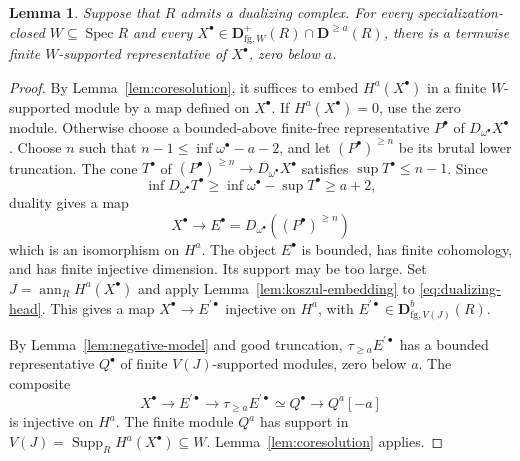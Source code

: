 \documentclass[11pt]{amsart}
\numberwithin{equation}{section}
\newtheorem{lemma}[theorem]{Lemma}
\theoremstyle{definition}
\theoremstyle{remark}
\DeclareMathOperator{\Supp}{Supp}
\DeclareMathOperator{\Spec}{Spec}
\newcommand{\D}{\mathbf D}
\newcommand{\fg}{\mathrm{fg}}
\begin{document}
\begin{lemma}
\label{lem:dualizing-supported-model}
Suppose that $R$ admits a dualizing complex. For every specialization-closed
$W\subseteq\Spec R$ and every
$X^{\bullet}\in\D^+_{\fg,W}(R)\cap\D^{\geq a}(R)$, there is a termwise finite
$W$-supported representative of $X^{\bullet}$, zero below $a$.
\end{lemma}
\begin{proof}
By Lemma~\ref{lem:coresolution}, it suffices to embed $H^a(X^{\bullet})$
in a finite $W$-supported module by a map defined on $X^{\bullet}$.
If $H^a(X^{\bullet})=0$, use the zero module. Otherwise choose a
bounded-above finite-free representative $P^{\bullet}$ of
$D_{\omega^{\bullet}}X^{\bullet}$. Choose $n$ such that
$n-1\leq\inf\omega^{\bullet}-a-2$, and let $(P^{\bullet})^{\geq n}$ be its brutal lower
truncation. The cone $T^{\bullet}$ of $(P^{\bullet})^{\geq n}\to D_{\omega^{\bullet}} X^{\bullet}$ satisfies
$\sup T^{\bullet}\leq n-1$. Since
\[
 \inf D_{\omega^{\bullet}} T^{\bullet}\geq\inf\omega^{\bullet}-\sup T^{\bullet}\geq a+2,
\]
duality gives a map
\begin{equation}\label{eq:dualizing-head}
 X^{\bullet}\longrightarrow E^{\bullet}=D_{\omega^{\bullet}}((P^{\bullet})^{\geq n})
\end{equation}
which is an isomorphism on $H^a$.
The object $E^{\bullet}$ is bounded, has finite cohomology, and has
finite injective dimension. Its support may be too large.
Set $J=\operatorname{ann}_R H^a(X^{\bullet})$ and apply
Lemma~\ref{lem:koszul-embedding} to \eqref{eq:dualizing-head}. This gives a map
$X^{\bullet}\to E^{\prime\bullet}$ injective on $H^a$, with
$E^{\prime\bullet}\in\D^b_{\fg,V(J)}(R)$.

By Lemma~\ref{lem:negative-model} and good truncation,
$\tau_{\geq a}E^{\prime\bullet}$ has a bounded representative $Q^{\bullet}$ of finite
$V(J)$-supported modules, zero below $a$. The composite
\[
 X^{\bullet}\longrightarrow E^{\prime\bullet}\longrightarrow\tau_{\geq a}E^{\prime\bullet}
 \simeq Q^{\bullet}\longrightarrow Q^a[-a]
\]
is injective on $H^a$. The finite module $Q^a$ has support in
$V(J)=\Supp_RH^a(X^{\bullet})\subseteq W$.
Lemma~\ref{lem:coresolution} applies.
\end{proof}
\end{document}
